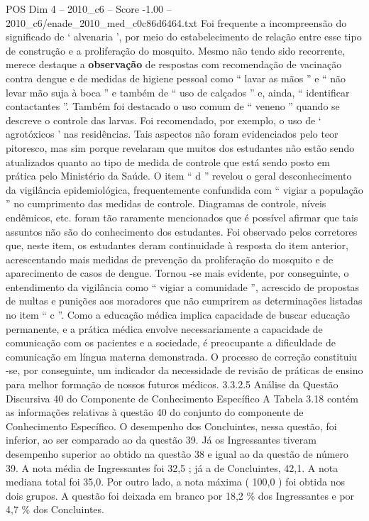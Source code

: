 \begin{textsample}{POS Dim 4 – 2010\_c6 – Score -1.00 – 2010\_c6/enade\_2010\_med\_c0c86d6464.txt}
Foi frequente a incompreensão do significado de ‘ alvenaria ’, por meio do estabelecimento de relação entre esse tipo de construção e a proliferação do mosquito.
Mesmo não tendo sido recorrente, merece destaque a \textbf{observação} de respostas com recomendação de vacinação contra dengue e de medidas de higiene pessoal como “ lavar as mãos ” e “ não levar mão suja à boca ” e também de “ uso de calçados ” e, ainda, “ identificar contactantes ”.
Também foi destacado o uso comum de “ veneno ” quando se descreve o controle das larvas.
Foi recomendado, por exemplo, o uso de ‘ agrotóxicos ’ nas residências.
Tais aspectos não foram evidenciados pelo teor pitoresco, mas sim porque revelaram que muitos dos estudantes não estão sendo atualizados quanto ao tipo de medida de controle que está sendo posto em prática pelo Ministério da Saúde.
O item “ d ” revelou o geral desconhecimento da vigilância epidemiológica, frequentemente confundida com “ vigiar a população ” no cumprimento das medidas de controle.
Diagramas de controle, níveis endêmicos, etc. foram tão raramente mencionados que é possível afirmar que tais assuntos não são do conhecimento dos estudantes.
Foi observado pelos corretores que, neste item, os estudantes deram continuidade à resposta do item anterior, acrescentando mais medidas de prevenção da proliferação do mosquito e de aparecimento de casos de dengue.
Tornou -se mais evidente, por conseguinte, o entendimento da vigilância como “ vigiar a comunidade ”, acrescido de propostas de multas e punições aos moradores que não cumprirem as determinações listadas no item “ c ”.
Como a educação médica implica capacidade de buscar educação permanente, e a prática médica envolve necessariamente a capacidade de comunicação com os pacientes e a sociedade, é preocupante a dificuldade de comunicação em língua materna demonstrada.
O processo de correção constituiu -se, por conseguinte, um indicador da necessidade de revisão de práticas de ensino para melhor formação de nossos futuros médicos. 3.3.2.5 Análise da Questão Discursiva 40 do Componente de Conhecimento Específico A Tabela 3.18 contém as informações relativas à questão 40 do conjunto do componente de Conhecimento Específico.
O desempenho dos Concluintes, nessa questão, foi inferior, ao ser comparado ao da questão 39.
Já os Ingressantes tiveram desempenho superior ao obtido na questão 38 e igual ao da questão de número 39.
A nota média de Ingressantes foi 32,5 ; já a de Concluintes, 42,1.
A nota mediana total foi 35,0.
Por outro lado, a nota máxima ( 100,0 ) foi obtida nos dois grupos.
A questão foi deixada em branco por 18,2 \% dos Ingressantes e por 4,7 \% dos Concluintes.

\end{textsample}
